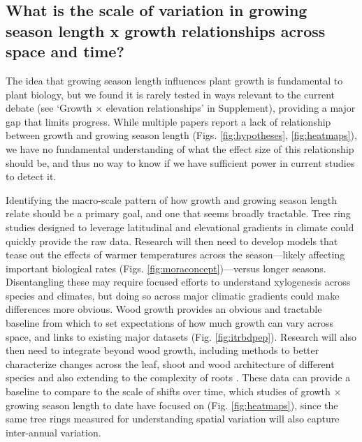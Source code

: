 \documentclass[11pt]{article}
\newcommand{\R}[1]{\label{#1}\linelabel{#1}}
\begin{document}

\subsection*{What is the scale of variation in growing season length x growth relationships across space and time?}

The idea that growing season length influences plant growth is fundamental to plant biology, but we found it is rarely tested in ways relevant to the current debate (see `Growth $\times$ elevation relationships' in Supplement), providing a major gap that limits progress. While multiple papers report a lack of relationship between growth and growing season length (Figs. \ref{fig:hypotheses}, \ref{fig:heatmaps}), we have no fundamental understanding of what the effect size of this relationship should be, and thus no way to know if we have sufficient power in current studies to detect it. %

Identifying the macro-scale pattern of how growth and growing season length relate should be a primary goal, and one that seems broadly tractable. \R{R2rate2S}Tree ring studies designed to leverage latitudinal and elevational gradients in climate could quickly provide the raw data. Research will then need to develop models that tease out the effects of warmer temperatures across the season---likely affecting important biological rates  (Figs. \ref{fig:moraconcept})---versus longer seasons. Disentangling these may require focused efforts to understand xylogenesis across species and climates, but doing so across major climatic gradients could make differences more obvious.\R{R2rate2E} Wood growth provides an obvious and tractable baseline from which to set expectations of how much growth can vary across space, and links to existing major datasets (Fig. \ref{fig:itrbdpep}).  Research will also then need to integrate beyond wood growth, including methods to better characterize changes across the leaf, shoot and wood architecture of different species \citep[e.g.,][]{puletti2020lidar,sillett2024ground} and also extending to the complexity of roots \citep{mckown2016impacts,radville2016}. These data can provide a baseline to compare to the scale of shifts over time, which studies of growth $\times$ growing season length to date have focused on (Fig. \ref{fig:heatmaps}), since the same tree rings measured for understanding spatial variation will also capture inter-annual variation. 
\end{document}
